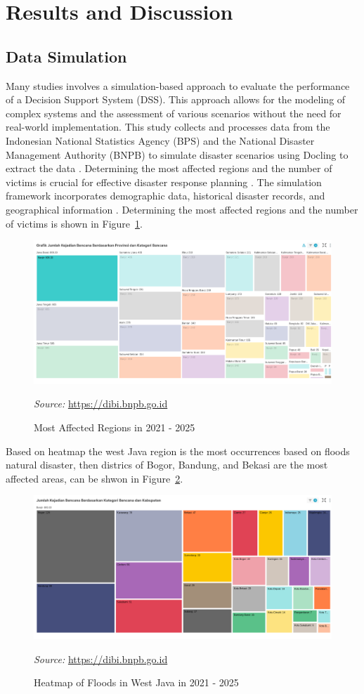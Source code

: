 \documentclass[journal,final,a4paper,twoside,11pt]{IEEEtran}
\begin{document}
\section{Results and Discussion}

\subsection{Data Simulation}

Many studies involves a simulation-based approach to evaluate the performance of a Decision Support System (DSS)\cite{he2020dynamic}. This approach allows for the modeling of complex systems and the assessment of various scenarios without the need for real-world implementation\cite{latchmore2023integrating}. This study collects and processes data from the Indonesian National Statistics Agency (BPS) and the National Disaster Management Authority (BNPB) to simulate disaster scenarios using Docling to extract the data \cite{Docling}. Determining the most affected regions and the number of victims is crucial for effective disaster response planning \cite{endo2020estimating}. The simulation framework incorporates demographic data, historical disaster records, and geographical information \cite{santos2020workforce}. Determining the most affected regions and the number of victims is shown in Figure~\ref{fig:simulationframework}. 
\begin{figure}[htbp]
    \centerline{\includegraphics[width=0.8\linewidth]{fig4.png}
    }
    \caption{Most Affected Regions in 2021 - 2025}
    \label{fig:simulationframework}
    \footnotesize{\textit{Source:} \url{https://dibi.bnpb.go.id}}
\end{figure}

Based on heatmap the west Java region is the most occurrences based on floods natural disaster, then districs of Bogor, Bandung, and Bekasi are the most affected areas, can be shwon in Figure~\ref{fig:heatmap2}. 
\begin{figure}[htbp]
    \centerline{\includegraphics[width=0.8\linewidth]{fig5.png}}
    \caption{Heatmap of Floods in West Java in 2021 - 2025}
    \label{fig:heatmap2}
    \footnotesize{\textit{Source:} \url{https://dibi.bnpb.go.id}}
\end{figure} 
\end{document}
